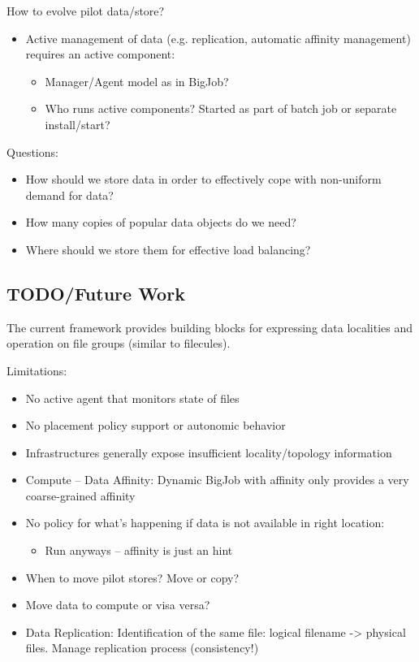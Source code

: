 \documentclass[]{article}
\begin{document}
How to evolve pilot data/store?
\begin{itemize}
	\item Active management of data (e.g. replication, automatic affinity management) requires an active component:
	\begin{itemize}
		\item Manager/Agent model as in BigJob?
		\item Who runs active components? Started as part of batch job or separate install/start?
	\end{itemize}
\end{itemize}

Questions:
\begin{itemize}
    \item How should
    we store data in order to effectively cope with non-uniform demand for
    data? 
    \item How many copies of popular data objects do we need? 
    \item Where should we store them for effective load balancing?
\end{itemize}

\subsection{TODO/Future Work}
The current framework provides building blocks for expressing data localities and operation on file groups (similar to filecules).

Limitations:
\begin{itemize}
    \item No active agent that monitors state of files
    \item No placement policy support or autonomic behavior
    \item Infrastructures generally expose insufficient locality/topology information
    \item Compute – Data Affinity: Dynamic BigJob with affinity only provides a very coarse-grained affinity
    \item No policy for what’s happening if data is not available in right location:
    \begin{itemize}
        \item Run anyways – affinity is just an hint
    \end{itemize}
    \item When to move pilot stores? Move or copy?
    \item Move data to compute or visa versa?
    \item Data Replication: Identification of the same file: logical filename -> physical files. Manage replication process (consistency!)
\end{itemize}
\end{document}
